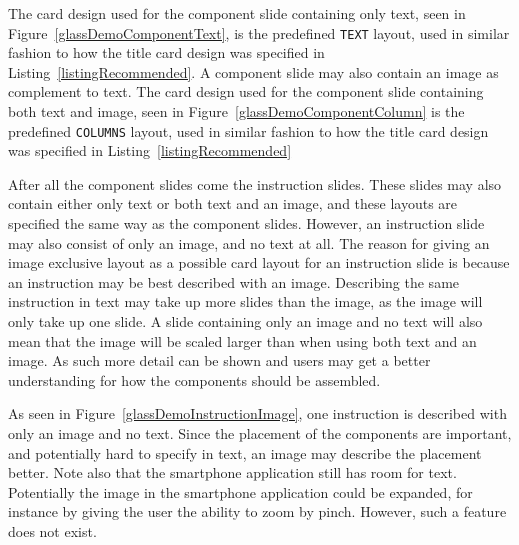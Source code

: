 The card design used for the component slide containing only text, seen in Figure~\ref{glassDemoComponentText}, is the predefined \texttt{TEXT} layout, used in similar fashion to how the title card design was specified in Listing~\ref{listingRecommended}. A component slide may also contain an image as complement to text. The card design used for the component slide containing both text and image, seen in Figure~\ref{glassDemoComponentColumn} is the predefined \texttt{COLUMNS} layout, used in similar fashion to how the title card design was specified in Listing~\ref{listingRecommended}

After all the component slides come the instruction slides. These slides may also contain either only text or both text and an image, and these layouts are specified the same way as the component slides. However, an instruction slide may also consist of only an image, and no text at all. The reason for giving an image exclusive layout as a possible card layout for an instruction slide is because an instruction may be best described with an image. Describing the same instruction in text may take up more slides than the image, as the image will only take up one slide. A slide containing only an image and no text will also mean that the image will be scaled larger than when using both text and an image. As such more detail can be shown and users may get a better understanding for how the components should be assembled.

As seen in Figure~\ref{glassDemoInstructionImage}, one instruction is described with only an image and no text. Since the placement of the components are important, and potentially hard to specify in text, an image may describe the placement better. Note also that the smartphone application still has room for text. Potentially the image in the smartphone application could be expanded, for instance by giving the user the ability to zoom by pinch. However, such a feature does not exist.

